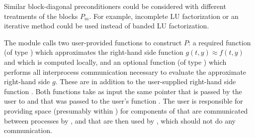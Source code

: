 Similar block-diagonal preconditioners could be considered with different
treatments of the blocks $P_m$. For example, incomplete LU factorization or
an iterative method could be used instead of banded LU factorization.

The {\cvbbdpre} module calls two user-provided functions to construct $P$: 
a required function  (of type ) which approximates
the right-hand side function $g(t,y) \approx f(t,y)$ and which is computed locally,
and an optional function  (of type ) which performs 
all interprocess communication necessary to evaluate the approximate right-hand
side $g$.  These are in addition to the user-supplied right-hand side function
.  Both functions take as input the same pointer  that is passed
by the user to  and that was passed to the user's function .
The user is responsible for providing space (presumably within )
for components of  that are communicated between processes by , and
that are then used by , which should not do any communication.

